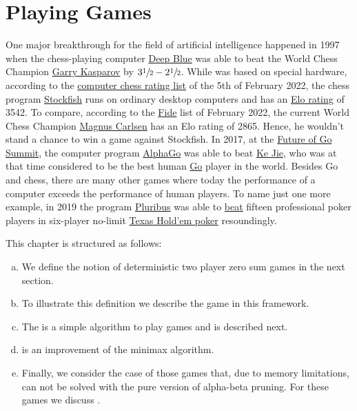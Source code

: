 \chapter{Playing Games}
One major breakthrough for the field of artificial intelligence happened in 1997 when the chess-playing computer
\href{https://en.wikipedia.org/wiki/Deep_Blue_(chess_computer)}{Deep Blue} was able to beat the World Chess
Champion \href{https://en.wikipedia.org/wiki/Garry_Kasparov}{Garry Kasparov} by $3\sfrac{1}{2}-2\sfrac{1}{2}$.
While   was based on special hardware, according to the
\href{http://www.computerchess.org.uk/ccrl/4040/rating_list_all.html}{computer chess rating list} of the 5th
of February 2022, the chess program \href{https://en.wikipedia.org/wiki/Stockfish_(chess)}{Stockfish} runs
on ordinary desktop computers and has an \href{https://en.wikipedia.org/wiki/Elo_rating_system}{Elo rating} of 3542.  
To compare, according to the
\href{https://ratings.fide.com/top.phtml?list=men}{Fide} list of February 2022, the current 
World Chess Champion \href{https://en.wikipedia.org/wiki/Magnus_Carlsen}{Magnus Carlsen} has an Elo rating of
2865.  Hence, he wouldn't stand a chance to win a game against Stockfish.  In 2017, at the 
\href{https://en.wikipedia.org/wiki/Future_of_Go_Summit}{Future of Go Summit},  the computer program
\href{https://en.wikipedia.org/wiki/AlphaGo}{AlphaGo}  was able to beat
\href{https://en.wikipedia.org/wiki/Ke_Jie}{Ke Jie},  
who was at that time considered to be the best human
\href{https://en.wikipedia.org/wiki/Go_(game)}{Go} player in the world. 
Besides Go and chess, there are many other games where today the performance of a computer exceeds the
performance of human players.  To name just one more example, in 2019 the program
\href{https://en.wikipedia.org/wiki/Pluribus_(poker_bot)}{Pluribus}  was able to  
\href{https://arstechnica.com/science/2019/07/facebook-ai-pluribus-defeats-top-poker-professionals-in-6-player-texas-holdem/}{beat}
fifteen professional poker players in six-player no-limit 
\href{https://en.wikipedia.org/wiki/Texas_hold_%27em}{Texas Hold'em poker} resoundingly.

This chapter is structured as follows:
\begin{enumerate}[(a)]
\item We define the notion of deterministic two player zero sum games in the next section.
\item To illustrate this definition we describe the game  in this framework.
\item The  is a simple algorithm to play games and is described next.
\item {} is an improvement of the minimax algorithm.
\item Finally, we consider the case of those games that, due to memory limitations, can not be solved
      with the pure version of alpha-beta pruning.  For these games we discuss . 
\end{enumerate}

